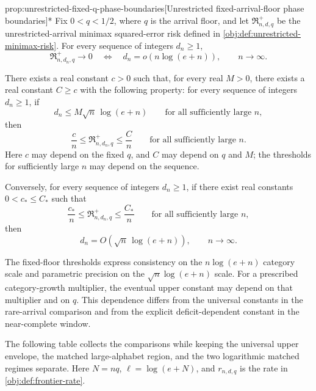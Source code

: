 \documentclass[11pt]{article}
\begin{document}
\begin{propositionv}{prop:unrestricted-fixed-q-phase-boundaries}[Unrestricted fixed-arrival-floor phase boundaries]*
Fix \(0<q<1/2\), where \(q\) is the arrival floor, and let \(\mathfrak R^{+}_{n,d,q}\) be the unrestricted-arrival minimax squared-error risk defined in \cref{obj:def:unrestricted-minimax-risk}. For every sequence of integers \(d_n\ge1\),
\[
\mathfrak R^{+}_{n,d_n,q}\longrightarrow0
\quad\Longleftrightarrow\quad
d_n=o\!\left(n\log(e+n)\right),
\qquad n\to\infty.
\]

There exists a real constant \(c>0\) such that, for every real \(M>0\), there exists a real constant \(C\ge c\) with the following property: for every sequence of integers \(d_n\ge1\), if
\[
d_n\le M\sqrt n\,\log(e+n)
\qquad\text{for all sufficiently large }n,
\]
then
\[
\frac{c}{n}\le\mathfrak R^{+}_{n,d_n,q}\le\frac{C}{n}
\qquad\text{for all sufficiently large }n.
\]
Here \(c\) may depend on the fixed \(q\), and \(C\) may depend on \(q\) and \(M\); the thresholds for sufficiently large \(n\) may depend on the sequence.

Conversely, for every sequence of integers \(d_n\ge1\), if there exist real constants \(0<c_*\le C_*\) such that
\[
\frac{c_*}{n}\le\mathfrak R^{+}_{n,d_n,q}\le\frac{C_*}{n}
\qquad\text{for all sufficiently large }n,
\]
then
\[
d_n=O\!\left(\sqrt n\,\log(e+n)\right),
\qquad n\to\infty.
\]
\end{propositionv}

The fixed-floor thresholds express consistency on the \(n\log(e+n)\) category scale and parametric precision on the \(\sqrt n\log(e+n)\) scale. For a prescribed category-growth multiplier, the eventual upper constant may depend on that multiplier and on \(q\). This dependence differs from the universal constants in the rare-arrival comparison and from the explicit deficit-dependent constant in the near-complete window.

The following table collects the comparisons while keeping the universal upper envelope, the matched large-alphabet region, and the two logarithmic matched regimes separate. Here \(N=nq\), \(\ell=\log(e+N)\), and \(r_{n,d,q}\) is the rate in \cref{obj:def:frontier-rate}.
\end{document}
